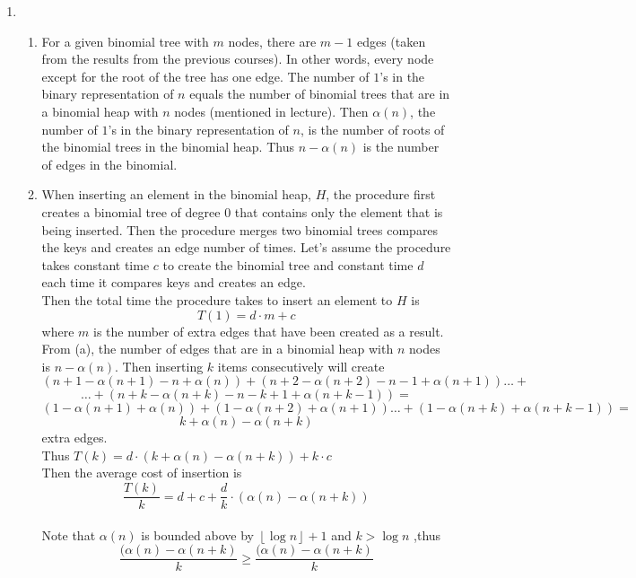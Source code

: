 \documentclass{article}
\begin{document}
\begin{enumerate}
\item 
    \begin{enumerate}
        \item For a given binomial tree with $m$ nodes, there are $m-1$ edges (taken from the results from the previous courses). In other words, every node except for the root of the tree has one edge. The number of $1$'s in the binary representation of $n$ equals the number of binomial trees that are in a binomial heap with $n$ nodes (mentioned in lecture). Then $\alpha(n)$, the number of $1$'s in the binary representation of $n$, is the number of roots of the binomial trees in the binomial heap. Thus $n-\alpha(n)$ is the number of edges in the binomial.
        \item When inserting an element in the binomial heap, $H$, the procedure first creates a binomial tree of degree 0 that contains only the element that is being inserted. Then the procedure merges two binomial trees compares the keys and creates an edge number of times. Let's assume the procedure takes constant time $c$ to create the binomial tree and constant time $d$ each time it compares keys and creates an edge.
        \\Then the total time the procedure takes to insert an element to $H$ is $$T(1) = d\cdot m + c$$ where $m$ is the number of extra edges that have been created as a result.
        \\ From (a), the number of edges that are in a binomial heap with $n$ nodes is $n - \alpha(n)$. Then inserting $k$ items consecutively will create 
        $$(n + 1 -\alpha(n+1) - n + \alpha(n)) + (n + 2 -\alpha(n+2) - n - 1 + \alpha(n + 1)) \dots+$$ 
        $$\dots+(n + k -\alpha(n+k) - n - k + 1 + \alpha(n + k - 1))=$$
        $$ (1 -\alpha(n+1) + \alpha(n)) + (1 -\alpha(n+2) + \alpha(n + 1)) \dots + (1 -\alpha(n+k) + \alpha(n+k-1))=$$
        $$k + \alpha(n) - \alpha(n+k)$$
        extra edges.
        \\Thus $T(k) = d \cdot (k + \alpha(n) - \alpha(n+k)) + k \cdot c$
        \\Then the average cost of insertion is $$\frac{T(k)}{k} = d + c + \frac{d}{k}\cdot(\alpha(n) - \alpha(n+k))$$
        \\ Note that $\alpha(n)$ is bounded above by $\left \lfloor{\log n}\right \rfloor + 1$ and $ k > \log n$ ,thus \\$$\frac{(\alpha(n) - \alpha(n+k)}{k}\ge\frac{(\alpha(n) - \alpha(n+k)}{k}$$
    \end{enumerate}

\end{enumerate}
\end{document}

